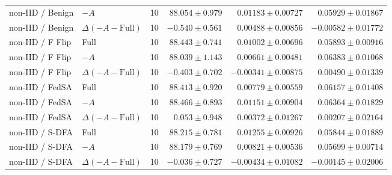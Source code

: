 \begin{table}[t]
\begin{tabular}{llrrrr}
non-IID / Benign & $-A$ & 10 & $88.054 \pm 0.979$ & $0.01183 \pm 0.00727$ & $0.05929 \pm 0.01867$ \\
non-IID / Benign & $\Delta(-A-\mathrm{Full})$ & 10 & $-0.540 \pm 0.561$ & $0.00488 \pm 0.00856$ & $-0.00582 \pm 0.01772$ \\
non-IID / F Flip & Full & 10 & $88.443 \pm 0.741$ & $0.01002 \pm 0.00696$ & $0.05893 \pm 0.00916$ \\
non-IID / F Flip & $-A$ & 10 & $88.039 \pm 1.143$ & $0.00661 \pm 0.00481$ & $0.06383 \pm 0.01068$ \\
non-IID / F Flip & $\Delta(-A-\mathrm{Full})$ & 10 & $-0.403 \pm 0.702$ & $-0.00341 \pm 0.00875$ & $0.00490 \pm 0.01339$ \\
non-IID / FedSA & Full & 10 & $88.413 \pm 0.920$ & $0.00779 \pm 0.00559$ & $0.06157 \pm 0.01408$ \\
non-IID / FedSA & $-A$ & 10 & $88.466 \pm 0.893$ & $0.01151 \pm 0.00904$ & $0.06364 \pm 0.01829$ \\
non-IID / FedSA & $\Delta(-A-\mathrm{Full})$ & 10 & $0.053 \pm 0.948$ & $0.00372 \pm 0.01267$ & $0.00207 \pm 0.02164$ \\
non-IID / S-DFA & Full & 10 & $88.215 \pm 0.781$ & $0.01255 \pm 0.00926$ & $0.05844 \pm 0.01889$ \\
non-IID / S-DFA & $-A$ & 10 & $88.179 \pm 0.769$ & $0.00821 \pm 0.00536$ & $0.05699 \pm 0.00714$ \\
non-IID / S-DFA & $\Delta(-A-\mathrm{Full})$ & 10 & $-0.036 \pm 0.727$ & $-0.00434 \pm 0.01082$ & $-0.00145 \pm 0.02006$ \\
\bottomrule
\end{tabular}
\end{table}

